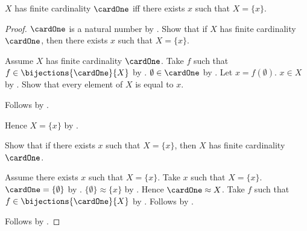 \begin{proposition}\label{finite_cardinality_one_iff_singleton}
    $X$ has finite cardinality $\cardOne$ iff
        there exists $x$ such that $X=\{x\}$.
\end{proposition}
\begin{proof}
    $\cardOne$ is a natural number by
        .
    Show that if $X$ has finite cardinality $\cardOne$, then
        there exists $x$ such that $X=\{x\}$.
    \begin{subproof}
        Assume $X$ has finite cardinality $\cardOne$.
        Take $f$ such that $f\in\bijections{\cardOne}{X}$ by
            .
        $\emptyset\in\cardOne$ by
            .
        Let $x=f(\emptyset)$.
        $x\in X$ by .
        Show that every element of $X$ is equal to $x$.
        \begin{subproof}
            Follows by .
        \end{subproof}
        Hence $X=\{x\}$ by .
    \end{subproof}
    Show that if there exists $x$ such that $X=\{x\}$, then
        $X$ has finite cardinality $\cardOne$.
    \begin{subproof}
        Assume there exists $x$ such that $X=\{x\}$.
        Take $x$ such that $X=\{x\}$.
        $\cardOne=\{\emptyset\}$ by
            .
        $\{\emptyset\}\approx\{x\}$ by .
        Hence $\cardOne\approx X$.
        Take $f$ such that $f\in\bijections{\cardOne}{X}$ by
            .
        Follows by .
    \end{subproof}
    Follows by \auto.
\end{proof}


